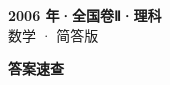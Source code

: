 \documentclass[zihao=-4, a4paper]{ctexart}
\begin{document}
\begin{center}
  {\Large\bfseries 2006 年·全国卷Ⅱ·理科}\\[4pt]
  {\large 数学 · 简答版}
\end{center}
\medskip
{}

\clearpage
{}
\begin{center}{\Large\bfseries 答案速查}\end{center}
\medskip

\end{document}
